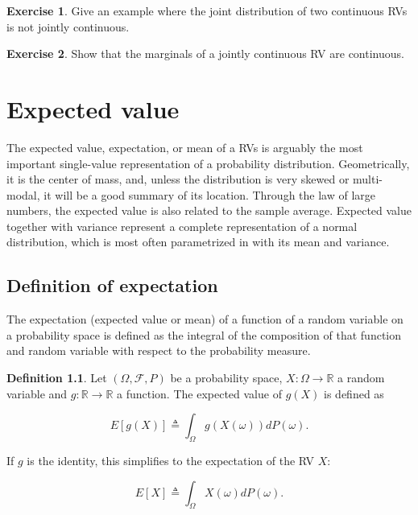 \documentclass{book}
\theoremstyle{plain}%
\theoremstyle{definition}
\newtheorem{definition}{Definition}[section]
\newtheorem{exercise}{Exercise}[chapter]
\newlength{\arrow}
\begin{document}
\begin{exercise}
Give an example where the joint distribution of two continuous RVs is not jointly continuous.
\end{exercise}

\begin{exercise}
Show that the marginals of a jointly continuous RV are continuous.
\end{exercise}

\chapter{Expected value}

The expected value, expectation, or mean of a RVs is arguably the most important single-value representation of a probability distribution. Geometrically, it is the center of mass, and, unless the distribution is very skewed or multi-modal, it will be a good summary of its location. Through the law of large numbers, the expected value is also related to the sample average. Expected value together with variance represent a complete representation of a normal distribution, which is most often parametrized in with its mean and variance.

\section{Definition of expectation}

The expectation (expected value or mean) of a function of a random variable on a probability space is defined as the integral of the composition of that function and random variable with respect to the probability measure.

\begin{definition}
Let $(\Omega, \mathcal{F}, P)$ be a probability space, $X: \Omega \rightarrow \mathbb{R}$ a random variable and $g: \mathbb{R} \rightarrow \mathbb{R}$ a function. The expected value of $g(X)$ is defined as

$$E[g(X)] \triangleq \int_{\Omega} g(X(\omega))dP(\omega).$$

If $g$ is the identity, this simplifies to the expectation of the RV $X$:

$$E[X] \triangleq \int_{\Omega} X(\omega)dP(\omega).$$
\end{definition}
\end{document}
